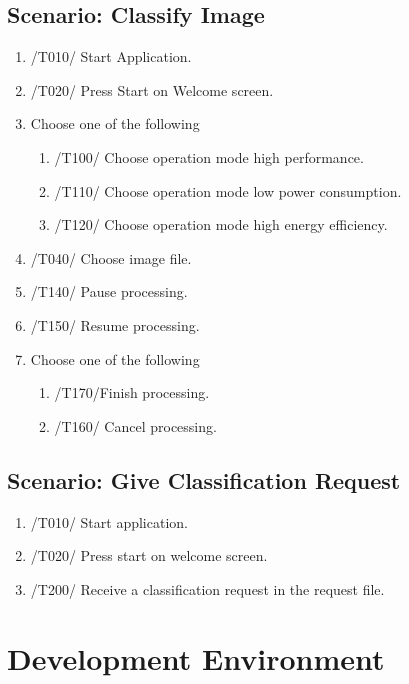 \documentclass[parskip=full]{scrartcl}
\begin{document}
\pagebreak



\subsection {Scenario: Classify Image}

\begin{enumerate}
	\item /T010/ Start Application.
	\item /T020/ Press Start on Welcome screen.
	\item Choose one of the following
	\begin{enumerate}
		\item /T100/ Choose operation mode high performance.
		\item /T110/ Choose operation mode low power consumption.
		\item /T120/ Choose operation mode high energy efficiency.
	\end{enumerate}
	\item /T040/ Choose image file.
	\item /T140/ Pause processing.
	\item /T150/ Resume processing.
	\item Choose one of the following
	\begin{enumerate}
		\item /T170/Finish processing.
		\item /T160/ Cancel processing.
	\end{enumerate}
\end{enumerate}

\subsection {Scenario: Give Classification Request}

\begin{enumerate}
	\item /T010/ Start application.  
	\item /T020/ Press start on welcome screen.
	\item /T200/ Receive a classification request in the request file.
\end{enumerate}

\pagebreak



\section{Development Environment}
\end{document}
